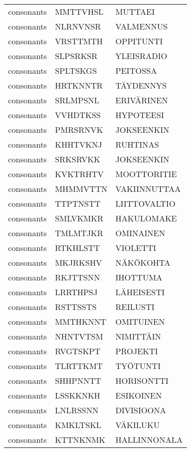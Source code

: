 \begin{tabular}{lll}
 consonants &  MMTTVHSL &            MUTTAEI \\
 consonants &  NLRNVNSR &          VALMENNUS \\
 consonants &  VRSTTMTH &          OPPITUNTI \\
 consonants &  SLPSRKSR &         YLEISRADIO \\
 consonants &  SPLTSKGS &           PEITOSSA \\
 consonants &  HRTKNNTR &          TÄYDENNYS \\
 consonants &  SRLMPSNL &         ERIVÄRINEN \\
 consonants &  VVHDTKSS &          HYPOTEESI \\
 consonants &  PMRSRNVK &         JOKSEENKIN \\
 consonants &  KHHTVKNJ &           RUHTINAS \\
 consonants &  SRKSRVKK &         JOKSEENKIN \\
 consonants &  KVKTRHTV &        MOOTTORITIE \\
 consonants &  MHMMVTTN &       VAKIINNUTTAA \\
 consonants &  TTPTNSTT &       LIITTOVALTIO \\
 consonants &  SMLVKMKR &         HAKULOMAKE \\
 consonants &  TMLMTJKR &          OMINAINEN \\
 consonants &  RTKHLSTT &           VIOLETTI \\
 consonants &  MKJRKSHV &          NÄKÖKOHTA \\
 consonants &  RKJTTSNN &           IHOTTUMA \\
 consonants &  LRRTHPSJ &         LÄHEISESTI \\
 consonants &  RSTTSSTS &           REILUSTI \\
 consonants &  MMTHKNNT &          OMITUINEN \\
 consonants &  NHNTVTSM &          NIMITTÄIN \\
 consonants &  RVGTSKPT &           PROJEKTI \\
 consonants &  TLRTTKMT &           TYÖTUNTI \\
 consonants &  SHHPNNTT &         HORISONTTI \\
 consonants &  LSSKKNKH &          ESIKOINEN \\
 consonants &  LNLRSSNN &         DIVISIOONA \\
 consonants &  KMKLTSKL &           VÄKILUKU \\
 consonants &  KTTNKNMK &       HALLINNONALA \\

\end{tabular}
